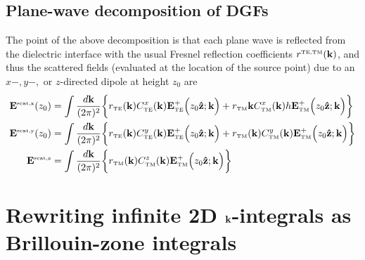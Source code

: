\documentclass[letterpaper]{article}
\begin{document}
\subsection{Plane-wave decomposition of DGFs}

The point of the above decomposition is that each
plane wave is reflected from the dielectric interface
with the usual Fresnel reflection coefficients
$r^{\hbox{\tiny{TE,TM}}}(\mathbf{k})$, and thus the scattered fields 
(evaluated at the location of the source point)
due to an $x-,y-,$ or $z$-directed dipole at height
$z_0$ are 
\begin{align*}
 \mathbf{E}^{\hbox{\tiny{scat,x}}}(z_0)
&= \int \frac{d\mathbf{k}}{(2\pi)^2}
   \bigg\{ r_{\hbox{\tiny{TE}}}(\mathbf{k}) C^{x}_{\hbox{\tiny{TE}}}(\mathbf{k})
           \mathbf{E}^+_{\hbox{\tiny{TE}}}\Big(z_0\mathbf{\hat z}; \mathbf{k}\Big)
           + 
           r_{\hbox{\tiny{TM}}}{\mathbf{k}} C^{x}_{\hbox{\tiny{TM}}}(\mathbf{k})
 h          \mathbf{E}^+_{\hbox{\tiny{TM}}}\Big(z_0\mathbf{\hat z}; \mathbf{k}\Big)
    \bigg\}
\\
  \mathbf{E}^{\hbox{\tiny{scat,y}}}(z_0)
 &= \int \frac{d \mathbf{k}}{(2\pi)^2} 
    \bigg\{ r_{\hbox{\tiny{TE}}}(\mathbf{k}) C^{y}_{\hbox{\tiny{TE}}}(\mathbf{k})
            \mathbf{E}^+_{\hbox{\tiny{TE}}}\Big(z_0\mathbf{\hat z}; \mathbf{k}\Big)
           + 
            r_{\hbox{\tiny{TM}}}(\mathbf{k}) C^{y}_{\hbox{\tiny{TM}}}(\mathbf{k})
            \mathbf{E}^+_{\hbox{\tiny{TM}}}\Big(z_0\mathbf{\hat z}; \mathbf{k}\Big)
    \bigg\}
 \\
  \mathbf{E}^{\hbox{\tiny{scat,z}}}
 &= \int \frac{d \mathbf{k}}{(2\pi)^2} 
    \bigg\{        r_{\hbox{\tiny{TM}}}(\mathbf{k}) C^{z}_{\hbox{\tiny{TM}}}(\mathbf{k})
            \mathbf{E}^+_{\hbox{\tiny{TM}}}\Big(z_0\mathbf{\hat z}; \mathbf{k}\Big)
    \bigg\}
\end{align*}

\newpage
\section{Rewriting infinite 2D $\mathbf{k}$-integrals as Brillouin-zone integrals}
\label{RewritingAppendix}
\end{document}
